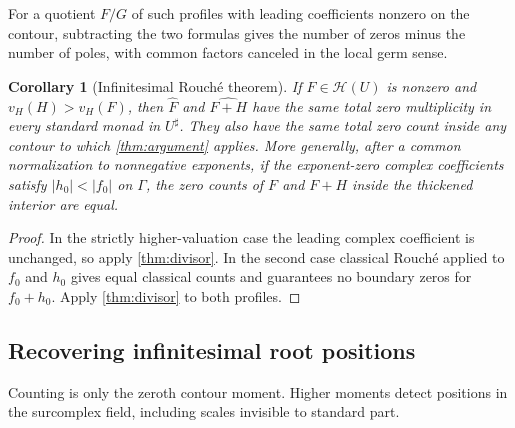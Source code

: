 \documentclass[11pt,a4paper]{article}
\numberwithin{equation}{section}
\newtheorem{corollary}[theorem]{Corollary}
\theoremstyle{definition}
\newcommand{\HH}{\mathscr H}
\newcommand{\hhat}[1]{\widehat{#1}}
\newcommand{\vprof}{v_{\!H}}
\begin{document}
For a quotient $F/G$ of such profiles with leading coefficients nonzero on
the contour, subtracting the two formulas gives the number of zeros minus
the number of poles, with common factors canceled in the local germ sense.

\begin{corollary}[Infinitesimal Rouch\'e theorem]\label{cor:rouche}
If $F\in\HH(U)$ is nonzero and
$\vprof(H)>\vprof(F)$, then $\hhat F$ and $\hhat{F+H}$ have the same total
zero multiplicity in every standard monad in $U^\sharp$. They also have the
same total zero count inside any contour to which \cref{thm:argument} applies.
More generally, after a common normalization to nonnegative exponents, if the
exponent-zero complex coefficients satisfy $|h_0|<|f_0|$ on $\Gamma$, the zero counts of
$F$ and $F+H$ inside the thickened interior are equal.
\end{corollary}
\begin{proof}
In the strictly higher-valuation case the leading complex coefficient is
unchanged, so apply \cref{thm:divisor}. In the second case classical Rouch\'e
applied to $f_0$ and $h_0$ gives equal classical counts and guarantees no
boundary zeros for $f_0+h_0$. Apply \cref{thm:divisor} to both profiles.
\end{proof}

\subsection{Recovering infinitesimal root positions}

Counting is only the zeroth contour moment. Higher moments detect positions
in the surcomplex field, including scales invisible to standard part.
\end{document}
